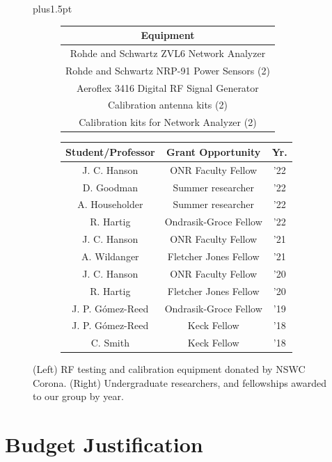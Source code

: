 \documentclass[10pt]{amsart}
\renewcommand{\footnotesize}{\small\spaceskip4pt plus1.5pt}
\theoremstyle{definition}
\numberwithin{equation}{section}
\begin{document}
\begin{figure}[hb]
\footnotesize
\centering
\begin{subfigure}{0.45\textwidth}
\centering
\begin{tabular}{c}
Equipment\\ \hline
Rohde and Schwartz ZVL6 Network Analyzer \\
Rohde and Schwartz NRP-91 Power Sensors (2) \\
Aeroflex 3416 Digital RF Signal Generator \\
Calibration antenna kits (2) \\
Calibration kits for Network Analyzer (2)
\end{tabular}
\end{subfigure}
\hspace{0.5cm}
\begin{subfigure}{0.45\textwidth}
\centering
\begin{tabular}{c c c}
Student/Professor & Grant Opportunity & Yr. \\ \hline
J. C. Hanson & ONR Faculty Fellow & '22 \\
D. Goodman & Summer researcher & '22 \\
A. Householder & Summer researcher & '22 \\
R. Hartig & Ondrasik-Groce Fellow & '22 \\
J. C. Hanson & ONR Faculty Fellow & '21 \\
A. Wildanger & Fletcher Jones Fellow & '21 \\
J. C. Hanson & ONR Faculty Fellow & '20 \\
R. Hartig & Fletcher Jones Fellow & '20 \\
J. P. G\'{o}mez-Reed & Ondrasik-Groce Fellow & '19 \\
J. P. G\'{o}mez-Reed & Keck Fellow & '18 \\
C. Smith & Keck Fellow & '18
\end{tabular}
\end{subfigure}
\caption{\label{tab:fac} (Left) RF testing and calibration equipment donated by NSWC Corona. (Right) Undergraduate researchers, and fellowships awarded to our group by year.}
\end{figure}

\section{Budget Justification}
\end{document}
